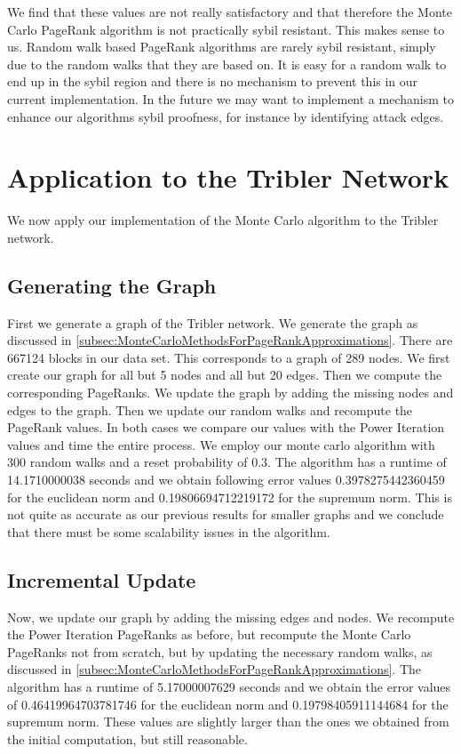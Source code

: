 \documentclass[sigconf]{acmart}
\theoremstyle{definition}
\begin{document}
We find that these values are not really satisfactory and that therefore the Monte Carlo PageRank algorithm is not practically sybil resistant. This makes sense to us. Random walk based PageRank algorithms are rarely sybil resistant, simply due to the random walks that they are based on. It is easy for a random walk to end up in the sybil region and there is no mechanism to prevent this in our current implementation. In the future we may want to implement a mechanism to enhance our algorithms sybil proofness, for instance by identifying attack edges. 
\section{Application to the Tribler Network}
\label{sec:ApplicationToTheTriblerNetwork}
We now apply our implementation of the Monte Carlo algorithm to the Tribler network.
\subsection{Generating the Graph}
\label{subsec:GeneratingTheGraph}
First we generate a graph of the Tribler network. We generate the graph as discussed in \ref{subsec:MonteCarloMethodsForPageRankApproximations}. There are 667124 blocks in our data set. This corresponds to a graph of 289 nodes. We first create our graph for all but 5 nodes and all but 20 edges. Then we compute the corresponding PageRanks. We update the graph by adding the missing nodes and edges to the graph. Then we update our random walks and recompute the PageRank values. In both cases we compare our values with the Power Iteration values and time the entire process. We employ our monte carlo algorithm with 300 random walks and a reset probability of 0.3. The algorithm has a runtime of 14.1710000038 seconds and we obtain following error values 0.3978275442360459 for the euclidean norm and 0.19806694712219172 for the supremum norm. This is not quite as accurate as our previous results for smaller graphs and we conclude that there must be some scalability issues in the algorithm.

\subsection{Incremental Update}
\label{subsec:IncrementalUpdates}
Now, we update our graph by adding the missing edges and nodes. We recompute the Power Iteration PageRanks as before, but recompute the Monte Carlo PageRanks not from scratch, but by updating the necessary random walks, as discussed in \ref{subsec:MonteCarloMethodsForPageRankApproximations}. The algorithm has a runtime of 5.17000007629 seconds and we obtain the error values of 0.46419964703781746 for the euclidean norm and 0.19798405911144684 for the supremum norm. These values are slightly larger than the ones we obtained from the initial computation, but still reasonable. 
\end{document}
